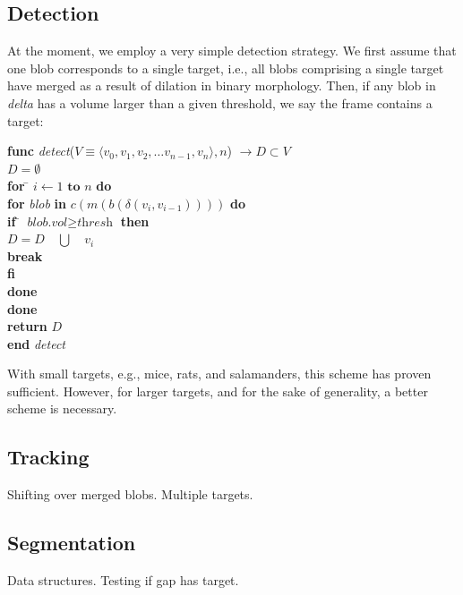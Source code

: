 \documentclass[letter]{article}
\begin{document}
\subsection{Detection}
At the moment, we employ a very simple detection strategy. We first assume that 
one blob corresponds to a single target, i.e., all blobs comprising
a single target have merged as a result of dilation in binary morphology. Then, if 
any blob in \textit{delta} has a volume larger than a given threshold, we say the 
frame contains a target: 
\begin{tabbing}
\textbf{func} \= \textit{detect}($V \equiv \langle v_0, v_1, v_2, \dots v_{n-1}, v_n \rangle, n$) 
 $\rightarrow D \subset V$\\
\> \+ $D = \emptyset$ \\
      \textbf{for} \= $i \leftarrow 1 \textbf{ to } n$ \textbf{do}\\
      \> \+ \textbf{for} \= \textit{blob} \textbf{in} $c(m(b(\delta(v_i, v_{i-1}))))$ \textbf{do}\\
           \> \+ \textbf{if} \= $\textit{blob.vol} \ge \textit{thresh}$ \textbf{then}\\
              \> \+ $D = D \quad \bigcup \quad {v_i}$\\
                    \textbf{break}\\ 
              \< \- \textbf{fi}\\ 
      \< \- \textbf{done}\\ 
     \< \- \textbf{done}\\ 
     \textbf{return} $D$\\ 
\< \- \textbf{end} \textit{detect}
\end{tabbing}

With small targets, e.g., mice, rats, and salamanders, this scheme has proven sufficient. 
However, for larger targets, and for the sake of generality, a better scheme is necessary. 

\subsection{Tracking}
Shifting over merged blobs. 
Multiple targets. 

\subsection{Segmentation}
Data structures. 
Testing if gap has target. 
 
\end{document}
